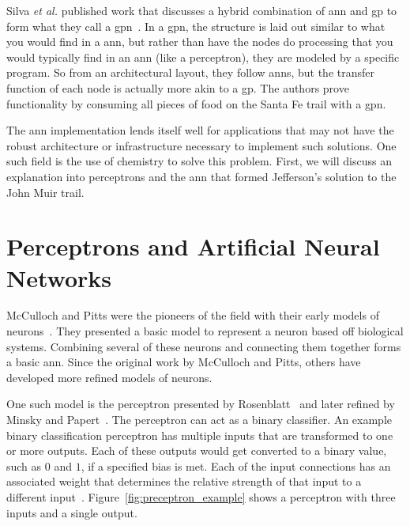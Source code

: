 Silva \textit{et al.} published work that discusses a hybrid combination of \gls{ann} and \gls{gp} to form what they call a \gls{gpn}~\cite{Silva1999-kw}. In a \gls{gpn}, the structure is laid out similar to what you would find in a \gls{ann}, but rather than have the nodes do processing that you would typically find in an \gls{ann} (like a perceptron), they are modeled by a specific program. So from an architectural layout, they follow \glspl{ann}, but the transfer function of each node is actually more akin to a \gls{gp}. The authors prove functionality by consuming all pieces of food on the Santa Fe trail with a \gls{gpn}.

The \gls{ann} implementation lends itself well for applications that may not have the robust architecture or infrastructure necessary to implement such solutions. One such field is the use of chemistry to solve this problem. First, we will discuss an explanation into perceptrons and the \gls{ann} that formed Jefferson's solution to the John Muir trail.

\section{Perceptrons and Artificial Neural Networks}
McCulloch and Pitts were the pioneers of the field with their early models of neurons~\cite{McCulloch1943-li}. They presented a basic model to represent a neuron based off biological systems. Combining several of these neurons and connecting them together forms a basic \gls{ann}. Since the original work by McCulloch and Pitts, others have developed more refined models of neurons.

One such model is the perceptron presented by Rosenblatt~\cite{Rosenblatt1958-yq} and later refined by Minsky and Papert~\cite{Minsky1987-zx}. The perceptron can act as a binary classifier. An example binary classification perceptron has multiple inputs that are transformed to one or more outputs. Each of these outputs would get converted to a binary value, such as $0$ and $1$, if a specified bias is met. Each of the input connections has an associated weight that determines the relative strength of that input to a different input~\cite{Rojas1996-yd}. Figure~\ref{fig:preceptron_example} shows a perceptron with three inputs and a single output.

